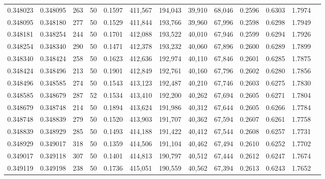 \begin{tabular}{rrrrrrrrrrrrr}
0.348023 & 0.348095 &   263 &  50 &                                     0.1597 & 411,567 & 194,043 &  39,910 &  68,046 & 0.2596 & 0.6303 & 1.7974 \\
0.348095 & 0.348180 &   277 &  50 &                                     0.1529 & 411,844 & 193,766 &  39,960 &  67,996 & 0.2598 & 0.6298 & 1.7949 \\
0.348181 & 0.348254 &   244 &  50 &                                     0.1701 & 412,088 & 193,522 &  40,010 &  67,946 & 0.2599 & 0.6294 & 1.7926 \\
0.348254 & 0.348340 &   290 &  50 &                                     0.1471 & 412,378 & 193,232 &  40,060 &  67,896 & 0.2600 & 0.6289 & 1.7899 \\
0.348340 & 0.348424 &   258 &  50 &                                     0.1623 & 412,636 & 192,974 &  40,110 &  67,846 & 0.2601 & 0.6285 & 1.7875 \\
0.348424 & 0.348496 &   213 &  50 &                                     0.1901 & 412,849 & 192,761 &  40,160 &  67,796 & 0.2602 & 0.6280 & 1.7856 \\
0.348496 & 0.348585 &   274 &  50 &                                     0.1543 & 413,123 & 192,487 &  40,210 &  67,746 & 0.2603 & 0.6275 & 1.7830 \\
0.348585 & 0.348679 &   287 &  52 &                                     0.1534 & 413,410 & 192,200 &  40,262 &  67,694 & 0.2605 & 0.6271 & 1.7804 \\
0.348679 & 0.348748 &   214 &  50 &                                     0.1894 & 413,624 & 191,986 &  40,312 &  67,644 & 0.2605 & 0.6266 & 1.7784 \\
0.348748 & 0.348839 &   279 &  50 &                                     0.1520 & 413,903 & 191,707 &  40,362 &  67,594 & 0.2607 & 0.6261 & 1.7758 \\
0.348839 & 0.348929 &   285 &  50 &                                     0.1493 & 414,188 & 191,422 &  40,412 &  67,544 & 0.2608 & 0.6257 & 1.7731 \\
0.348929 & 0.349017 &   318 &  50 &                                     0.1359 & 414,506 & 191,104 &  40,462 &  67,494 & 0.2610 & 0.6252 & 1.7702 \\
0.349017 & 0.349118 &   307 &  50 &                                     0.1401 & 414,813 & 190,797 &  40,512 &  67,444 & 0.2612 & 0.6247 & 1.7674 \\
0.349119 & 0.349198 &   238 &  50 &                                     0.1736 & 415,051 & 190,559 &  40,562 &  67,394 & 0.2613 & 0.6243 & 1.7652 \\

\end{tabular}

